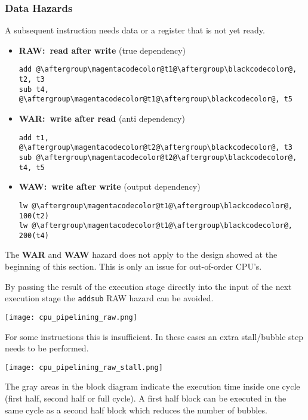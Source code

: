 \begin{multicols*}{3}
    \subsubsection{Data Hazards}\label{data hazards}

    A subsequent instruction needs data or a register that is not yet ready.

    \begin{itemize}
        \item \textbf{RAW:\ read after write} (true dependency)
              \begin{lstlisting}[escapechar=@]
add @\aftergroup\magentacodecolor@t1@\aftergroup\blackcodecolor@, t2, t3
sub t4, @\aftergroup\magentacodecolor@t1@\aftergroup\blackcodecolor@, t5
\end{lstlisting}
        \item \textbf{WAR:\ write after read} (anti dependency)
              \begin{lstlisting}[escapechar=@]
add t1, @\aftergroup\magentacodecolor@t2@\aftergroup\blackcodecolor@, t3
sub @\aftergroup\magentacodecolor@t2@\aftergroup\blackcodecolor@, t4, t5
\end{lstlisting}
        \item \textbf{WAW:\ write after write} (output dependency)
              \begin{lstlisting}[escapechar=@]
lw @\aftergroup\magentacodecolor@t1@\aftergroup\blackcodecolor@, 100(t2)
lw @\aftergroup\magentacodecolor@t1@\aftergroup\blackcodecolor@, 200(t4)
\end{lstlisting}
    \end{itemize}

    The \textbf{WAR} and \textbf{WAW} hazard does not apply to the design showed at the beginning of this section. This is only an issue for out-of-order CPU's.

    \newpar{}

    By passing the result of the execution stage directly into the input of the next execution stage the \texttt{add}\textleftarrow\texttt{sub} RAW hazard can be avoided.

    \texttt{[image: cpu\_pipelining\_raw.png]}

    For some instructions this is insufficient. In these cases an extra stall/bubble step needs to be performed.

    \texttt{[image: cpu\_pipelining\_raw\_stall.png]}

    The gray areas in the block diagram indicate the execution time inside one cycle (first half, second half or full cycle). A first half block can be executed in the same cycle as a second half block which reduces the number of bubbles.


\end{multicols*}
